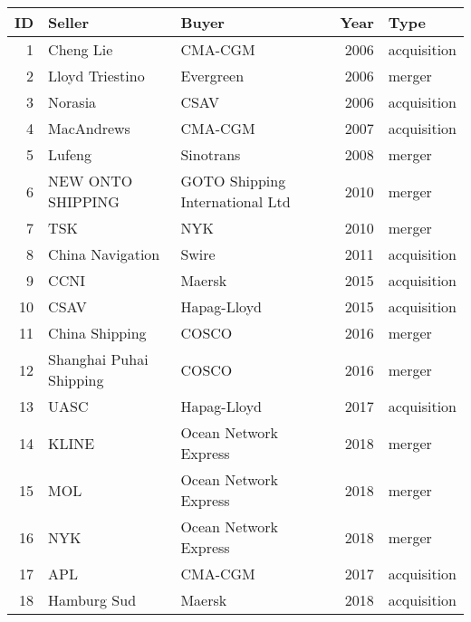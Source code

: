 
\begin{tabular}[t]{rllrl}
\toprule
ID & Seller & Buyer & Year & Type\\
\midrule
1 & Cheng Lie & CMA-CGM & 2006 & acquisition\\
2 & Lloyd Triestino & Evergreen & 2006 & merger\\
3 & Norasia & CSAV & 2006 & acquisition\\
4 & MacAndrews & CMA-CGM & 2007 & acquisition\\
5 & Lufeng & Sinotrans & 2008 & merger\\
6 & NEW ONTO SHIPPING & GOTO Shipping International Ltd & 2010 & merger\\
7 & TSK & NYK & 2010 & merger\\
8 & China Navigation & Swire & 2011 & acquisition\\
9 & CCNI & Maersk & 2015 & acquisition\\
10 & CSAV & Hapag-Lloyd & 2015 & acquisition\\
11 & China Shipping & COSCO & 2016 & merger\\
12 & Shanghai Puhai Shipping & COSCO & 2016 & merger\\
13 & UASC & Hapag-Lloyd & 2017 & acquisition\\
14 & KLINE & Ocean Network Express & 2018 & merger\\
15 & MOL & Ocean Network Express & 2018 & merger\\
16 & NYK & Ocean Network Express & 2018 & merger\\
17 & APL & CMA-CGM & 2017 & acquisition\\
18 & Hamburg Sud & Maersk & 2018 & acquisition\\
\bottomrule
\end{tabular}
